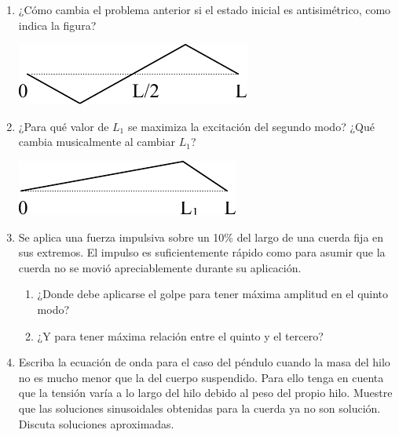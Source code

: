 \documentclass[11pt,spanish,a4paper]{article}
\begin{document}
\begin{enumerate}
\item ¿Cómo cambia el problema anterior si el estado inicial es antisimétrico, como indica la figura?
	\begin{center}
		\includegraphics[width=0.3\linewidth]{g03e05}
	\end{center}

\item ¿Para qué valor de \(L_1\) se maximiza la excitación del segundo modo?
	¿Qué cambia musicalmente al cambiar \(L_1\)?
	\begin{center}
		\includegraphics[width=0.3\linewidth]{g03e06}
	\end{center}

\item Se aplica una fuerza impulsiva sobre un 10\% del largo de una cuerda fija en sus extremos.
	El impulso es suficientemente rápido como para asumir que la cuerda no se movió apreciablemente durante su aplicación.
	\begin{enumerate}
		\item ¿Donde debe aplicarse el golpe para tener máxima amplitud en el quinto modo?
		\item ¿Y para tener máxima relación entre el quinto y el tercero?
	\end{enumerate}

\item Escriba la ecuación de onda para el caso del péndulo cuando la masa del hilo no es mucho menor que la del cuerpo suspendido.
	Para ello tenga en cuenta que la tensión varía a lo largo del hilo debido al peso del propio hilo.
	Muestre que las soluciones sinusoidales obtenidas para la cuerda ya no son solución.
	Discuta soluciones aproximadas.

\end{enumerate}
\end{document}
